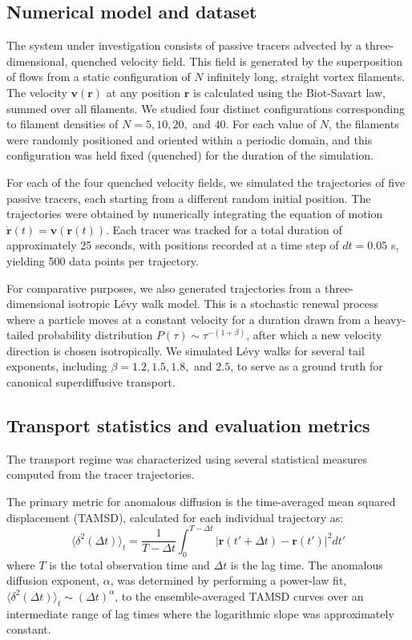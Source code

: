 \documentclass[]{article}
\begin{document}
\subsection{Numerical model and dataset}
The system under investigation consists of passive tracers advected by a three-dimensional, quenched velocity field. This field is generated by the superposition of flows from a static configuration of $N$ infinitely long, straight vortex filaments. The velocity $\mathbf{v}(\mathbf{r})$ at any position $\mathbf{r}$ is calculated using the Biot-Savart law, summed over all filaments. We studied four distinct configurations corresponding to filament densities of $N = 5, 10, 20,$ and $40$. For each value of $N$, the filaments were randomly positioned and oriented within a periodic domain, and this configuration was held fixed (quenched) for the duration of the simulation.

For each of the four quenched velocity fields, we simulated the trajectories of five passive tracers, each starting from a different random initial position. The trajectories were obtained by numerically integrating the equation of motion $\dot{\mathbf{r}}(t) = \mathbf{v}(\mathbf{r}(t))$. Each tracer was tracked for a total duration of approximately 25 seconds, with positions recorded at a time step of $dt = 0.05$ s, yielding 500 data points per trajectory.

For comparative purposes, we also generated trajectories from a three-dimensional isotropic L\'evy walk model. This is a stochastic renewal process where a particle moves at a constant velocity for a duration drawn from a heavy-tailed probability distribution $P(\tau) \sim \tau^{-(1+\beta)}$, after which a new velocity direction is chosen isotropically. We simulated L\'evy walks for several tail exponents, including $\beta=1.2, 1.5, 1.8,$ and $2.5$, to serve as a ground truth for canonical superdiffusive transport.

\subsection{Transport statistics and evaluation metrics}
The transport regime was characterized using several statistical measures computed from the tracer trajectories.

The primary metric for anomalous diffusion is the time-averaged mean squared displacement (TAMSD), calculated for each individual trajectory as:
\begin{equation}
\langle \delta^2(\Delta t) \rangle_t = \frac{1}{T - \Delta t} \int_0^{T - \Delta t} |\mathbf{r}(t' + \Delta t) - \mathbf{r}(t')|^2 dt'
\end{equation}
where $T$ is the total observation time and $\Delta t$ is the lag time. The anomalous diffusion exponent, $\alpha$, was determined by performing a power-law fit, $\langle \delta^2(\Delta t) \rangle_t \sim (\Delta t)^\alpha$, to the ensemble-averaged TAMSD curves over an intermediate range of lag times where the logarithmic slope was approximately constant.
\end{document}
